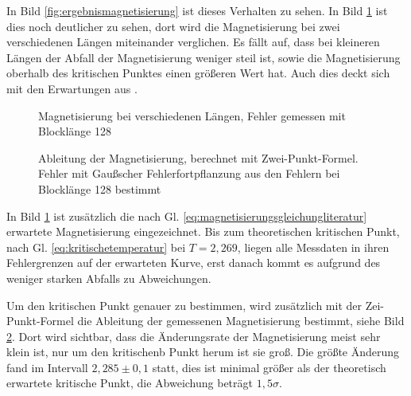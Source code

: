 \documentclass{scrreprt}
\begin{document}
	In Bild \ref{fig:ergebnismagnetisierung} ist dieses Verhalten zu sehen. In Bild \ref{fig:maglaenge} ist dies noch deutlicher zu sehen, dort wird die Magnetisierung bei zwei verschiedenen Längen miteinander verglichen. Es fällt auf, dass bei kleineren Längen der Abfall der Magnetisierung weniger steil ist, sowie die Magnetisierung oberhalb des kritischen Punktes einen größeren Wert hat. Auch dies deckt sich mit den Erwartungen aus \cite[Abschnitt 2.3.3]{binderheermann}.%
	
	
	\begin{figure}[htbp]
		
		\label{fig:maglaenge}
		\caption[Magnetisierung bei verschiedenen Längen]{Magnetisierung bei verschiedenen Längen, Fehler gemessen mit Blocklänge 128}
	\end{figure}

	\begin{figure}[htbp]
		
		\label{fig:ableitung120128}
		\caption[Ableitung der Magnetisierung]{Ableitung der Magnetisierung, berechnet mit Zwei-Punkt-Formel. Fehler mit Gaußscher Fehlerfortpflanzung aus den Fehlern bei Blocklänge 128 bestimmt}
	\end{figure}
	
	In Bild \ref{fig:maglaenge} ist zusätzlich die nach Gl. \ref{eq:magnetisierungsgleichungliteratur} erwartete Magnetisierung eingezeichnet. Bis zum theoretischen kritischen Punkt, nach Gl. \ref{eq:kritischetemperatur} bei $T=2,269$, liegen alle Messdaten in ihren Fehlergrenzen auf der erwarteten Kurve, erst danach kommt es aufgrund des weniger starken Abfalls zu Abweichungen.
	
	Um den kritischen Punkt genauer zu bestimmen, wird zusätzlich mit der Zei-Punkt-Formel die Ableitung der gemessenen Magnetisierung bestimmt, siehe Bild \ref{fig:ableitung120128}. Dort wird sichtbar, dass die Änderungsrate der Magnetisierung meist sehr klein ist, nur um den kritischenb Punkt herum ist sie groß. Die größte Änderung fand im Intervall $2,285\pm0,1$ statt, dies ist minimal größer als der theoretisch erwartete kritische Punkt, die Abweichung beträgt $1,5 \sigma$. 
	
\end{document}
